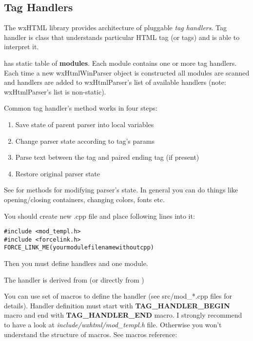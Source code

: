\subsection{Tag Handlers}\label{handlers}

The wxHTML library provides architecture of pluggable {\it tag handlers}.
Tag handler is class that understands particular HTML tag (or tags) and is
able to interpret it.

 has static table of {\bf modules}.
Each module contains one or more tag handlers. Each time a new wxHtmlWinParser
object is constructed all modules are scanned and handlers are added
to wxHtmlParser's list of available handlers (note: wxHtmlParser's list
is non-static).


Common tag handler's  method
works in four steps:

\begin{enumerate}\itemsep=0pt
\item Save state of parent parser into local variables
\item Change parser state according to tag's params
\item Parse text between the tag and paired ending tag (if present)
\item Restore original parser state
\end{enumerate}

See  for methods for modifying
parser's state. In general you can do things like opening/closing containers,
changing colors, fonts etc.


You should create new .cpp file and place following lines into it: 

\begin{verbatim}
#include <mod_templ.h>
#include <forcelink.h>
FORCE_LINK_ME(yourmodulefilenamewithoutcpp)
\end{verbatim}

Then you must define handlers and one module.


The handler is derived from 
(or directly from )

You can use set of macros to define the handler (see src/mod\_*.cpp files
for details). Handler definition must start with {\bf TAG\_HANDLER\_BEGIN} macro
and end with {\bf TAG\_HANDLER\_END} macro. I strongly recommend to have a look
at {\it include/wxhtml/mod\_templ.h} file. Otherwise you won't understand
the structure of macros. See macros reference:

